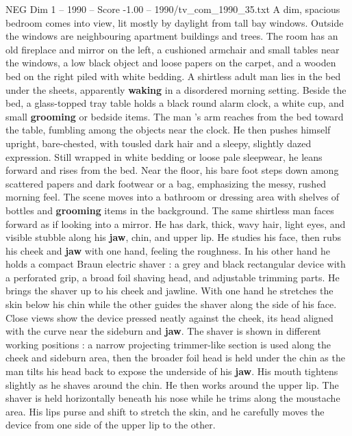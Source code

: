 \begin{textsample}{NEG Dim 1 – 1990 – Score -1.00 – 1990/tv\_com\_1990\_35.txt}  \label{ex:f1_neg_054}
A dim, spacious bedroom comes into view, lit mostly by daylight from tall bay windows.
Outside the windows are neighbouring apartment buildings and trees.
The room has an old fireplace and mirror on the left, a cushioned armchair and small tables near the windows, a low black object and loose papers on the carpet, and a wooden bed on the right piled with white bedding.
A shirtless adult man lies in the bed under the sheets, apparently \textbf{waking} in a disordered morning setting.
Beside the bed, a glass-topped tray table holds a black round alarm clock, a white cup, and small \textbf{grooming} or bedside items.
The man ’s arm reaches from the bed toward the table, fumbling among the objects near the clock.
He then pushes himself upright, bare-chested, with tousled dark hair and a sleepy, slightly dazed expression.
Still wrapped in white bedding or loose pale sleepwear, he leans forward and rises from the bed.
Near the floor, his bare foot steps down among scattered papers and dark footwear or a bag, emphasizing the messy, rushed morning feel.
The scene moves into a bathroom or dressing area with shelves of bottles and \textbf{grooming} items in the background.
The same shirtless man faces forward as if looking into a mirror.
He has dark, thick, wavy hair, light eyes, and visible stubble along his \textbf{jaw}, chin, and upper lip.
He studies his face, then rubs his cheek and \textbf{jaw} with one hand, feeling the roughness.
In his other hand he holds a compact Braun electric shaver : a grey and black rectangular device with a perforated grip, a broad foil shaving head, and adjustable trimming parts.
He brings the shaver up to his cheek and jawline.
With one hand he stretches the skin below his chin while the other guides the shaver along the side of his face.
Close views show the device pressed neatly against the cheek, its head aligned with the curve near the sideburn and \textbf{jaw}.
The shaver is shown in different working positions : a narrow projecting trimmer-like section is used along the cheek and sideburn area, then the broader foil head is held under the chin as the man tilts his head back to expose the underside of his \textbf{jaw}.
His mouth tightens slightly as he shaves around the chin.
He then works around the upper lip.
The shaver is held horizontally beneath his nose while he trims along the moustache area.
His lips purse and shift to stretch the skin, and he carefully moves the device from one side of the upper lip to the other.

\end{textsample}
